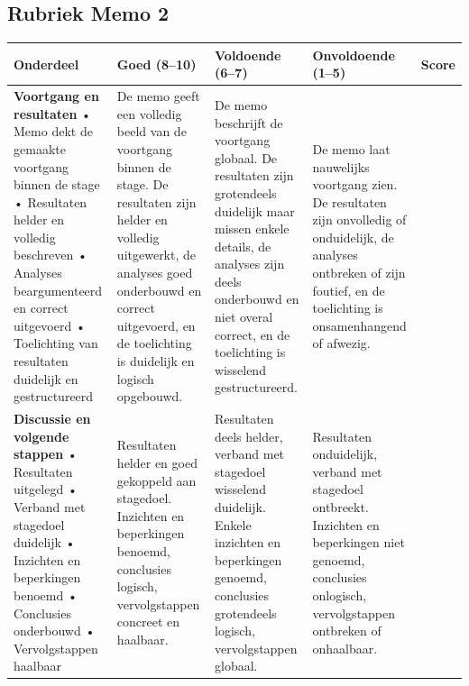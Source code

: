 \documentclass{article}
\begin{document}
\begin{landscape}

\section*{Rubriek Memo 2}
\renewcommand{\arraystretch}{1.5}

\begin{longtable}{p{7cm}|p{5cm}|p{5cm}|p{5cm}|p{1cm}}

\textbf{Onderdeel} & \textbf{Goed (8–10)} & \textbf{Voldoende (6–7)} & \textbf{Onvoldoende (1–5)} & \textbf{Score} \\
\hline
\hline

\textbf{Voortgang en resultaten} \newline
• Memo dekt de gemaakte voortgang binnen de stage \newline
• Resultaten helder en volledig beschreven \newline
• Analyses beargumenteerd en correct uitgevoerd \newline
• Toelichting van resultaten duidelijk en gestructureerd
&
De memo geeft een volledig beeld van de voortgang binnen de stage. De resultaten zijn helder en volledig uitgewerkt, de analyses goed onderbouwd en correct uitgevoerd, en de toelichting is duidelijk en logisch opgebouwd.
&
De memo beschrijft de voortgang globaal. De resultaten zijn grotendeels duidelijk maar missen enkele details, de analyses zijn deels onderbouwd en niet overal correct, en de toelichting is wisselend gestructureerd.
&
De memo laat nauwelijks voortgang zien. De resultaten zijn onvolledig of onduidelijk, de analyses ontbreken of zijn foutief, en de toelichting is onsamenhangend of afwezig.
& \\
\hline

\textbf{Discussie en volgende stappen} \newline
• Resultaten uitgelegd \newline
• Verband met stagedoel duidelijk \newline
• Inzichten en beperkingen benoemd \newline
• Conclusies onderbouwd \newline
• Vervolgstappen haalbaar
&
Resultaten helder en goed gekoppeld aan stagedoel. Inzichten en beperkingen benoemd, conclusies logisch, vervolgstappen concreet en haalbaar.
&
Resultaten deels helder, verband met stagedoel wisselend duidelijk. Enkele inzichten en beperkingen genoemd, conclusies grotendeels logisch, vervolgstappen globaal.
&
Resultaten onduidelijk, verband met stagedoel ontbreekt. Inzichten en beperkingen niet genoemd, conclusies onlogisch, vervolgstappen ontbreken of onhaalbaar.
& \\
\hline



\end{longtable}
\end{landscape}
\end{document}
